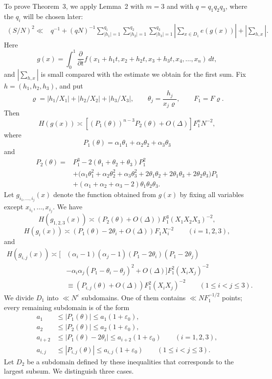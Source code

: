 \documentclass[10pt]{article}
\begin{document}
To prove Theorem~3, we apply Lemma~2 with $m=3$ and with
$q=q_1q_2q_3$, where the $q_i$ will be chosen later:
\begin{equation}
\begin{aligned}
  (S/N)^2\ll{}&q^{-1}+(qN)^{-1}
  \sum_{|h_1|=1}^{q_1}\sum_{|h_2|=1}^{q_2}\sum_{|h_3|=1}^{q_3}
  \left|\sum_{x\in D_1}e(g(x))\right|
  +\left|\sum_{h,x}\right|.
\end{aligned}
\tag{12}
\end{equation}
Here
\[
  g(x)=\int_0^1\frac{\partial}{\partial t}
  f(x_1+h_1t,x_2+h_2t,x_3+h_3t,x_4,\ldots,x_n)\,dt,
\]
and $\left|\sum_{h,x}\right|$ is small compared with the estimate we obtain for the first sum. Fix $h=(h_1,h_2,h_3)$, and put
\[
  \varrho=|h_1/X_1|+|h_2/X_2|+|h_3/X_3|,
  \qquad \theta_j=\frac{h_j}{x_j\varrho},
  \qquad F_1=F\varrho.
\]
Then
\[
  H(g(x))\asymp
  \left[(P_1(\theta))^{n-3}P_2(\theta)+O(\Delta)\right]F_1^nN^{-2},
\]
where
\[
  P_1(\theta)=\alpha_1\theta_1+\alpha_2\theta_2+\alpha_3\theta_3
\]
and
\[
\begin{aligned}
  P_2(\theta)={}&P_1^3-2(\theta_1+\theta_2+\theta_3)P_1^2\\
  &+\bigl(\alpha_1\theta_1^2+\alpha_2\theta_2^2+\alpha_3\theta_3^2
    +2\theta_1\theta_2+2\theta_1\theta_3+2\theta_2\theta_3\bigr)P_1\\
  &+(\alpha_1+\alpha_2+\alpha_3-2)\theta_1\theta_2\theta_3.
\end{aligned}
\]
Let $g_{i_1,\ldots,i_j}(x)$ denote the function obtained from $g(x)$ by fixing all variables except $x_{i_1},\ldots,x_{i_j}$. We have
\[
  H(g_{1,2,3}(x))\asymp
  (P_2(\theta)+O(\Delta))F_1^3(X_1X_2X_3)^{-2},
\]
\[
  H(g_i(x))\asymp
  (P_1(\theta)-2\theta_i+O(\Delta))F_1X_i^{-2}
  \qquad(i=1,2,3),
\]
and
\[
\begin{aligned}
  H(g_{i,j}(x))\asymp\Big[{}
  &(\alpha_i-1)(\alpha_j-1)(P_1-2\theta_i)(P_1-2\theta_j)\\
  &-\alpha_i\alpha_j(P_1-\theta_i-\theta_j)^2+O(\Delta)
  \Big]F_1^2(X_iX_j)^{-2}\\
  &\equiv(P_{i,j}(\theta)+O(\Delta))F_1^2(X_iX_j)^{-2}
  \qquad(1\leqslant i<j\leqslant3).
\end{aligned}
\]
We divide $D_1$ into $\ll N^\varepsilon$ subdomains. One of them contains $\ll NF_1^{-1/2}$ points; every remaining subdomain is of the form
\[
\begin{aligned}
  a_1&\leqslant|P_1(\theta)|\leqslant a_1(1+\varepsilon_0),\\
  a_2&\leqslant|P_2(\theta)|\leqslant a_2(1+\varepsilon_0),\\
  a_{i+2}&\leqslant|P_1(\theta)-2\theta_i|
    \leqslant a_{i+2}(1+\varepsilon_0)
    \qquad(i=1,2,3),\\
  a_{i,j}&\leqslant|P_{i,j}(\theta)|
    \leqslant a_{i,j}(1+\varepsilon_0)
    \qquad(1\leqslant i<j\leqslant3).
\end{aligned}
\]
Let $D_2$ be a subdomain defined by these inequalities that corresponds to the largest subsum. We distinguish three cases.
\end{document}
